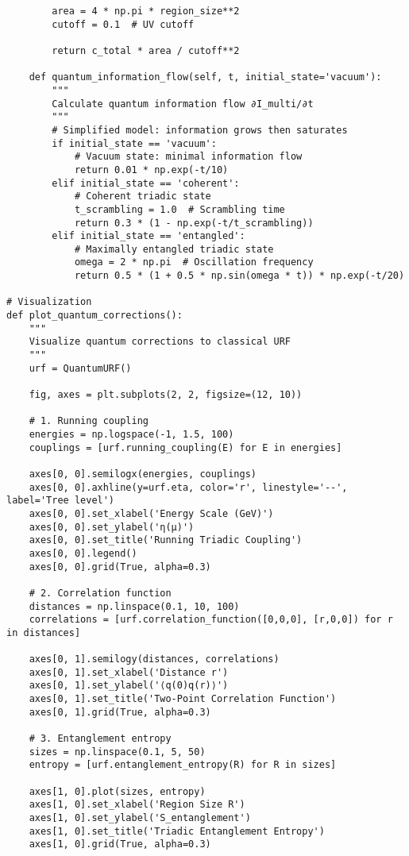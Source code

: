 \documentclass[openany]{memoir}
\theoremstyle{definition}
\theoremstyle{plain}
\theoremstyle{remark}
\begin{document}
\begin{lstlisting}
        area = 4 * np.pi * region_size**2
        cutoff = 0.1  # UV cutoff
        
        return c_total * area / cutoff**2
    
    def quantum_information_flow(self, t, initial_state='vacuum'):
        """
        Calculate quantum information flow ∂I_multi/∂t
        """
        # Simplified model: information grows then saturates
        if initial_state == 'vacuum':
            # Vacuum state: minimal information flow
            return 0.01 * np.exp(-t/10)
        elif initial_state == 'coherent':
            # Coherent triadic state
            t_scrambling = 1.0  # Scrambling time
            return 0.3 * (1 - np.exp(-t/t_scrambling))
        elif initial_state == 'entangled':
            # Maximally entangled triadic state
            omega = 2 * np.pi  # Oscillation frequency
            return 0.5 * (1 + 0.5 * np.sin(omega * t)) * np.exp(-t/20)

# Visualization
def plot_quantum_corrections():
    """
    Visualize quantum corrections to classical URF
    """
    urf = QuantumURF()
    
    fig, axes = plt.subplots(2, 2, figsize=(12, 10))
    
    # 1. Running coupling
    energies = np.logspace(-1, 1.5, 100)
    couplings = [urf.running_coupling(E) for E in energies]
    
    axes[0, 0].semilogx(energies, couplings)
    axes[0, 0].axhline(y=urf.eta, color='r', linestyle='--', label='Tree level')
    axes[0, 0].set_xlabel('Energy Scale (GeV)')
    axes[0, 0].set_ylabel('η(μ)')
    axes[0, 0].set_title('Running Triadic Coupling')
    axes[0, 0].legend()
    axes[0, 0].grid(True, alpha=0.3)
    
    # 2. Correlation function
    distances = np.linspace(0.1, 10, 100)
    correlations = [urf.correlation_function([0,0,0], [r,0,0]) for r in distances]
    
    axes[0, 1].semilogy(distances, correlations)
    axes[0, 1].set_xlabel('Distance r')
    axes[0, 1].set_ylabel('⟨q(0)q(r)⟩')
    axes[0, 1].set_title('Two-Point Correlation Function')
    axes[0, 1].grid(True, alpha=0.3)
    
    # 3. Entanglement entropy
    sizes = np.linspace(0.1, 5, 50)
    entropy = [urf.entanglement_entropy(R) for R in sizes]
    
    axes[1, 0].plot(sizes, entropy)
    axes[1, 0].set_xlabel('Region Size R')
    axes[1, 0].set_ylabel('S_entanglement')
    axes[1, 0].set_title('Triadic Entanglement Entropy')
    axes[1, 0].grid(True, alpha=0.3)
    

\end{lstlisting}
\end{document}
